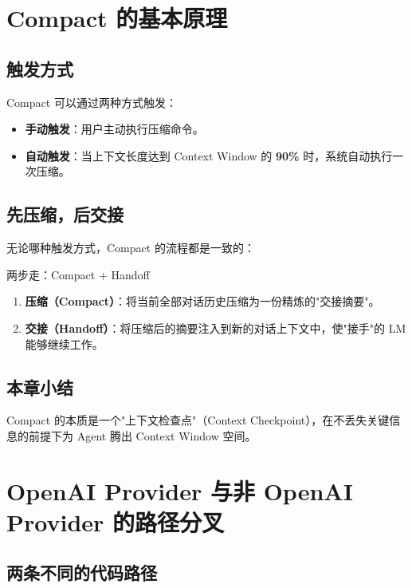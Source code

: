 \documentclass[a4paper]{article}
\begin{document}
\section{Compact 的基本原理}

\subsection{触发方式}

Compact 可以通过两种方式触发：

\begin{itemize}
    \item \textbf{手动触发}：用户主动执行压缩命令。
    \item \textbf{自动触发}：当上下文长度达到 Context Window 的 \textbf{90\%} 时，系统自动执行一次压缩。
\end{itemize}

\subsection{先压缩，后交接}

无论哪种触发方式，Compact 的流程都是一致的：

\begin{importantbox}{两步走：Compact + Handoff}
\begin{enumerate}
    \item \textbf{压缩（Compact）}：将当前全部对话历史压缩为一份精炼的"交接摘要"。
    \item \textbf{交接（Handoff）}：将压缩后的摘要注入到新的对话上下文中，使"接手"的 LM 能够继续工作。
\end{enumerate}
\end{importantbox}

\subsection{本章小结}

Compact 的本质是一个"上下文检查点"（Context Checkpoint），在不丢失关键信息的前提下为 Agent 腾出 Context Window 空间。


\section{OpenAI Provider 与非 OpenAI Provider 的路径分叉}

\subsection{两条不同的代码路径}
\end{document}
